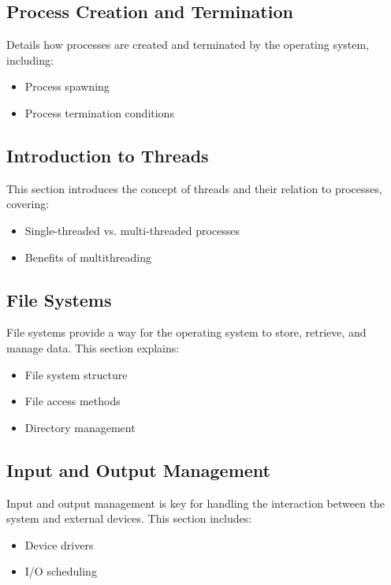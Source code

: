 \documentclass[12pt]{article}
\begin{document}
\subsection{Process Creation and Termination}
Details how processes are created and terminated by the operating system, including:
\begin{itemize}
    \item Process spawning
    \item Process termination conditions
\end{itemize}

\subsection{Introduction to Threads}
This section introduces the concept of threads and their relation to processes, covering:
\begin{itemize}
    \item Single-threaded vs. multi-threaded processes
    \item Benefits of multithreading
\end{itemize}

\subsection{File Systems}
File systems provide a way for the operating system to store, retrieve, and manage data. This section explains:
\begin{itemize}
    \item File system structure
    \item File access methods
    \item Directory management
\end{itemize}

\subsection{Input and Output Management}
Input and output management is key for handling the interaction between the system and external devices. This section includes:
\begin{itemize}
    \item Device drivers
    \item I/O scheduling
\end{itemize}
\end{document}
